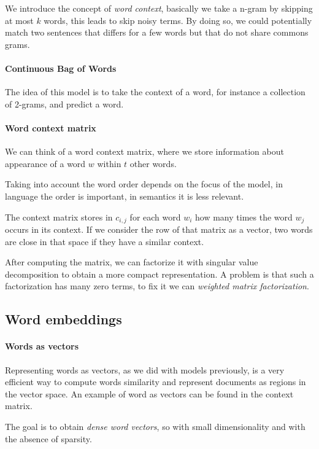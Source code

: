We introduce the concept of \emph{word context}, 
basically we take a n-gram by skipping at most $k$ words, 
this leads to skip noisy terms.
By doing so, we could potentially match two sentences 
that differs for a few words but that do not share commons 
grams.

\paragraph{Continuous Bag of Words}
The idea of this model is to take the context of a word, 
for instance a collection of 2-grams, and predict a word.

\paragraph{Word context matrix}
We can think of a word context matrix, where we 
store information about appearance of a word $w$ 
within $t$ other words.

Taking into account the word order depends on the focus of
the model, in language the order is important, in semantics
it is less relevant.

The context matrix stores in $c_{i, j}$ for each word $w_i$
how many times the word $w_j$ occurs in its context. 
If we consider the row of that matrix as a vector, two words 
are close in that space if they have a similar context.

After computing the matrix, we can factorize it with singular value 
decomposition to obtain a more compact representation.
A problem is that such a factorization has many zero terms, to 
fix it we can \emph{weighted matrix factorization}.

\subsection{Word embeddings}

\paragraph{Words as vectors}
Representing words as vectors, as we did with models previously, 
is a very efficient way to compute words similarity and 
represent documents as regions in the vector space.
An example of word as vectors can be found in the context matrix.

The goal is to obtain \emph{dense word vectors}, so with small dimensionality 
and with the absence of sparsity.

